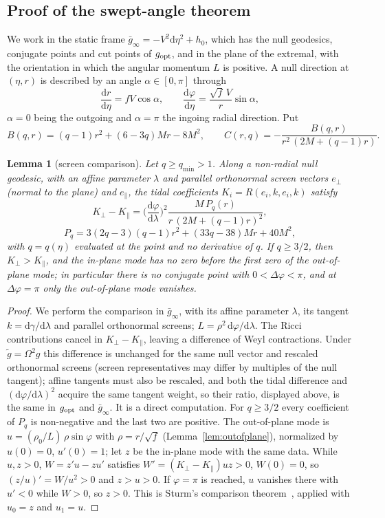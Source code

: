 \documentclass[aip,jmp,amsmath,amssymb,reprint]{revtex4-2}
\newcommand{\dd}{\mathrm{d}}
\newcommand{\gopt}{g_{\rm opt}}
\theoremstyle{plain}
\newtheorem{lemma}[proposition]{Lemma}
\theoremstyle{definition}
\begin{document}
\subsection{Proof of the swept-angle theorem}
\label{sec:angle-proof}
We work in the static frame $\bar g_\infty=-V^2\dd\eta^2+h_0$, which has the null geodesics,
conjugate points and cut points of $\gopt$, and in the plane of the extremal, with the
orientation in which the angular momentum $L$ is positive. A null direction at $(\eta,r)$ is
described by an angle $\alpha\in[0,\pi]$ through
\begin{equation}
  \frac{\dd r}{\dd\eta}=fV\cos\alpha,\qquad \frac{\dd\varphi}{\dd\eta}=\frac{\sqrt f\,V}{r}\sin\alpha,
  \label{eq:tk-alpha}
\end{equation}
$\alpha=0$ being the outgoing and $\alpha=\pi$ the ingoing radial direction. Put
\[
  B(q,r)=(q-1)r^2+(6-3q)Mr-8M^2,\qquad C(r,q)=-\frac{B(q,r)}{r^2\,(2M+(q-1)r)} .
\]

\begin{lemma}[screen comparison]\label{lem:tk-sturm}
Let $q\ge q_{\min}>1$. Along a non-radial null geodesic, with an affine parameter $\lambda$ and
parallel orthonormal screen vectors $e_\perp$ (normal to the plane) and $e_\parallel$, the tidal
coefficients $K_i=R(e_i,k,e_i,k)$ satisfy
\[
  K_\perp-K_\parallel=\Big(\frac{\dd\varphi}{\dd\lambda}\Big)^2\frac{M\,P_q(r)}{r\,(2M+(q-1)r)^2},
\]
\[
  P_q=3(2q-3)(q-1)r^2+(33q-38)Mr+40M^2,
\]
with $q=q(\eta)$ evaluated at the point and no derivative of $q$. If $q\ge3/2$, then
$K_\perp>K_\parallel$, and the in-plane mode has no zero before the first zero of the
out-of-plane mode; in particular there is no conjugate point with $0<\Delta\varphi<\pi$, and at
$\Delta\varphi=\pi$ only the out-of-plane mode vanishes.
\end{lemma}

\begin{proof}
We perform the comparison in $\bar g_\infty$, with its affine parameter $\lambda$, its tangent
$k=\dd\gamma/\dd\lambda$ and parallel orthonormal screens; $L=\rho^2\,\dd\varphi/\dd\lambda$. The Ricci
contributions cancel in $K_\perp-K_\parallel$, leaving a difference of Weyl contractions. Under
$\tilde g=\Omega^2g$ this difference is unchanged for the same null vector and rescaled orthonormal
screens (screen representatives may differ by multiples of the null tangent); affine tangents
must also be rescaled, and both the tidal difference and $(\dd\varphi/\dd\lambda)^2$ acquire the
same tangent weight, so their ratio, displayed above, is the same in $\gopt$ and $\bar g_\infty$.
It is a direct computation. For $q\ge3/2$ every coefficient of $P_q$ is non-negative and
the last two are positive. The out-of-plane mode is $u=(\rho_0/L)\,\rho\sin\varphi$ with
$\rho=r/\sqrt f$ (Lemma~\ref{lem:outofplane}), normalized by $u(0)=0$, $u'(0)=1$; let $z$ be the
in-plane mode with the same data. While $u,z>0$, $W=z'u-zu'$ satisfies
$W'=(K_\perp-K_\parallel)uz>0$, $W(0)=0$, so $(z/u)'=W/u^2>0$ and $z>u>0$. If $\varphi=\pi$ is reached,
$u$ vanishes there with $u'<0$ while $W>0$, so $z>0$. This is Sturm's comparison
theorem~\cite[Theorem~5.20]{Teschl}, applied with $u_0=z$ and $u_1=u$.
\end{proof}
\end{document}
